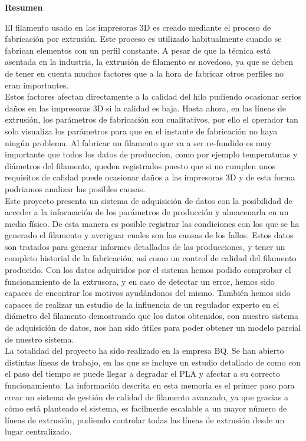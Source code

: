 
\thispagestyle{empty}
\begin{center}
    \Large
    \vspace{0.9cm}
    \textbf{Resumen}
\end{center}

El filamento usado en las impresoras 3D es creado mediante el proceso de fabricación por extrusión. Este proceso es utilizado habitualmente cuando se fabrican elementos con un perfil constante. A pesar de que la técnica está asentada en la industria, la extrusión de filamento es novedoso, ya que se deben de tener en cuenta muchos factores que a la hora de fabricar otros perfiles no eran importantes.\\

Estos factores afectan directamente a la calidad del hilo pudiendo ocasionar serios daños en las impresoras 3D si la calidad es baja. Hasta ahora, en las líneas de extrusión, los parámetros de fabricación son cualitativos, por ello el operador tan solo visualiza los parámetros para que en el instante de fabricación no haya ningún problema. Al fabricar un filamento que va a ser re-fundido es muy importante que todos los datos de produccion, como por ejemplo temperaturas y diámetros del filamento, queden registrados puesto que si no cumplen unos requisitos de calidad puede ocasionar daños a las impresoras 3D y de esta forma podriamos analizar las posibles causas.\\

Este proyecto presenta un sistema de adquisición de datos con la posibilidad de acceder a la información de los parámetros de producción y almacenarla en un medio físico. De esta manera es posible registrar las condiciones con los que se ha generado el filamento y averiguar cuales son las causas de los fallos. Estos datos son tratados para generar informes detallados de las producciones, y tener un completo historial de la fabricación, así como un control de calidad del filamento producido. Con los datos adquiridos por el sistema hemos podido comprobar el funcionamiento de la extrusora, y en caso de detectar un error, hemos sido capaces de encontrar los motivos ayudándonos del mismo. También hemos sido capaces de realizar un estudio de la influencia de un regulador experto en el diámetro del filamento demostrando que los datos obtenidos, con nuestro sistema de adquisición de datos, nos han sido útiles para poder obtener un modelo parcial de nuestro sistema.\\

La totalidad del proyecto ha sido realizado en la empresa BQ. Se han abierto distintas líneas de trabajo, en las que se incluye un estudio detallado de como con el paso del tiempo se puede llegar a degradar el PLA y afectar a su correcto funcionamiento. La información descrita en esta memoria es el primer paso para crear un sistema de gestión de calidad de filamento avanzado, ya que gracias a cómo está planteado el sistema, es facilmente escalable a un mayor número de líneas de extrusión, pudiendo controlar todas las líneas de extrusión desde un lugar centralizado.
